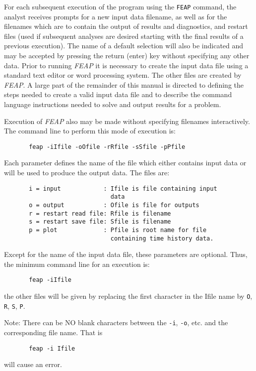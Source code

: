 For each subsequent execution of the program using the {\tt FEAP} command,
the analyst receives prompts for a new input data filename,
as well as for the filenames which are to contain the
output of results and diagnostics, and
restart files (used if subsequent analyses are desired starting 
with the final results of a previous execution).
The name of a default selection will also be indicated and may be accepted
by pressing the return (enter) key without specifying any other data.
Prior to running {\sl FEAP} it is necessary to create the input data file
using a standard text editor or word processing system. The other
files are created by {\sl FEAP}.  A large part of the remainder of
this manual is directed to defining
the steps needed to create a valid input data file and to describe the
command language instructions needed to solve and output results for
a problem.

Execution of {\sl FEAP} also may be made without specifying filenames 
interactively.  The command line to perform this mode of execution is:
\begin{verbatim}
       feap -iIfile -oOfile -rRfile -sSfile -pPfile
\end{verbatim}
Each parameter defines the name of the file which either contains input
data or will be used to produce the output data.  The files are:
\begin{verbatim}
       i = input            : Ifile is file containing input
                              data
       o = output           : Ofile is file for outputs
       r = restart read file: Rfile is filename
       s = restart save file: Sfile is filename
       p = plot             : Pfile is root name for file
                              containing time history data.
\end{verbatim}
Except for the name of the input data file, these parameters are optional.
Thus, the minimum command line for an execution is:
\begin{verbatim}
       feap -iIfile
\end{verbatim}
the other files will be given by replacing the first character
in the Ifile name by {\tt O}, {\tt R}, {\tt S}, {\tt P}.

\begin{description}
\item
Note: There can be NO blank characters between the {\tt -i}, {\tt -o}, etc.
and the corresponding file name.  That is
\begin{verbatim}
       feap -i Ifile
\end{verbatim}
will cause an error.
\end{description}

